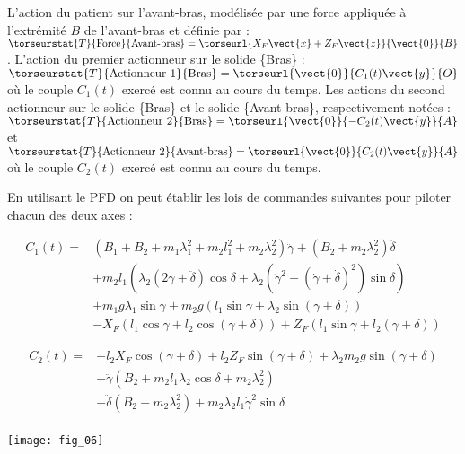 \begin{multicols}{2}
L’action du patient sur l’avant-bras, modélisée par une force appliquée à l’extrémité $B$ de l’avant-bras et
définie par : 
$\torseurstat{T}{\text{Force}}{\text{Avant-bras}}=\torseurl{X_F\vect{x}+Z_F\vect{z}}{\vect{0}}{B}$. 
L’action du premier actionneur sur le solide \{Bras\} : $\torseurstat{T}{\text{Actionneur 1}}{\text{Bras}}=\torseurl{\vect{0}}{C_1(t) \vect{y}}{O}$ où le couple $C_1(t)$ exercé est connu au cours du temps.
Les actions du second actionneur sur le solide \{Bras\} et le solide \{Avant-bras\}, respectivement notées :
$\torseurstat{T}{\text{Actionneur 2}}{\text{Bras}}=\torseurl{\vect{0}}{-C_2(t) \vect{y}}{A}$ et 
$\torseurstat{T}{\text{Actionneur 2}}{\text{Avant-bras}}=\torseurl{\vect{0}}{C_2(t) \vect{y}}{A}$ où le couple $C_2(t)$ exercé est connu au cours du temps.

En utilisant le PFD on peut établir les lois de commandes suivantes pour piloter chacun des deux axes : 

\footnotesize
$$
\begin{array}{ll}
C_1(t)=&
\left(B_1+B_2 +m_1 \lambda_1^2 + m_2 l_1^2 + m_2 \lambda_2^2 \right)\ddot{\gamma} +\left( B_2 + m_2\lambda_2^2\right) \ddot{\delta}\\
& +m_2 l_1 \left( \lambda_2 \left(2\ddot{\gamma}+\ddot{\delta} \right)\cos \delta + \lambda_2 \left( \dot{\gamma}^2-\left( \dot{\gamma} + \dot{\delta}\right)^2\right) \sin\delta\right) \\
& + m_1g\lambda_1\sin\gamma + m_2 g \left(l_1 \sin \gamma+\lambda_2 \sin \left(\gamma+ \delta\right) \right)\\
& -X_F \left( l_1 \cos \gamma +l_2 \cos \left( \gamma+\delta\right) \right) + Z_F \left( l_1 \sin \gamma + l_2 \left( \gamma + \delta \right)\right)
\end{array}
$$


$$
\begin{array}{ll}
C_2(t) =&  - l_2X_F \cos \left(\gamma+\delta\right) 
             + l_2 Z_F \sin \left(\gamma+\delta\right) 
             + \lambda_2m_2g\sin \left(\gamma+\delta\right) \\
&  + \ddot{\gamma}\left(B_2+m_2l_1\lambda_2 \cos\delta + m_2\lambda_2^2\right) \\
& +\ddot{\delta}\left(B_2+ m_2 \lambda_2^2\right) +m_2\lambda_2 l_1 \dot{\gamma}^2 \sin \delta \\
\end{array}
$$

\normalsize

\begin{center}
\texttt{[image: fig\_06]}
\end{center}



\end{multicols}
